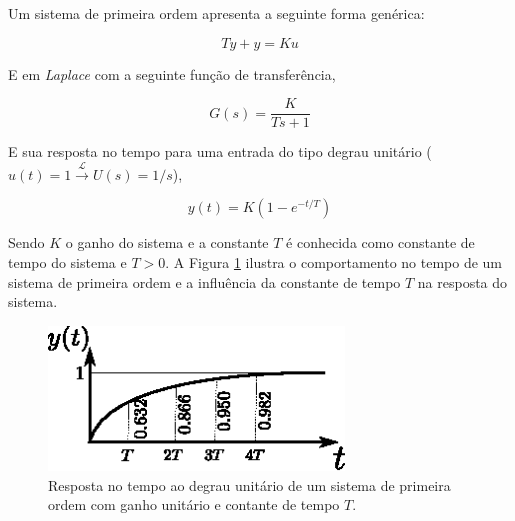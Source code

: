Um sistema de primeira ordem apresenta a seguinte forma genérica:

\begin{equation}
    T\dot{y} + y = Ku
\end{equation}

E em \emph{Laplace} com a seguinte função de transferência,

\begin{equation}
    G(s) = \frac{K}{Ts + 1}
\end{equation}

E sua resposta no tempo para uma entrada do tipo degrau unitário ($u(t) = 1 \xrightarrow{\mathscr{L}} U(s) = 1/s$),

\begin{equation}
    y(t) = K \left(1 - e^{-t/T} \right)
\end{equation}

Sendo $K$ o ganho do sistema e a constante $T$ é conhecida como constante de tempo do sistema e $T > 0$. A Figura \ref{fig:saida_sistema_primeira_ordem_no_tempo} ilustra o comportamento no tempo de um sistema de primeira ordem e a influência da constante de tempo $T$ na resposta do sistema.

\begin{figure}[H]
    \centering
    \includegraphics[width=0.7\textwidth]{figuras/ilustracoes/resposta_no_tempo_sistema_primeira_ordem.eps}
    \caption{Resposta no tempo ao degrau unitário de um sistema de primeira ordem com ganho unitário e contante de tempo $T$.}
    \label{fig:saida_sistema_primeira_ordem_no_tempo}
\end{figure}

